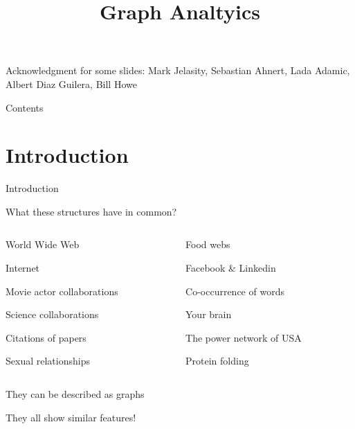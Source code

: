 
\title[Graph Analytics]{\textbf{Graph Analtyics}}



\newcommand{\Path}{\ell}
\newcommand{\Diam}{\mathit{diam}}

\begin{frame}
\titlepage

{\footnotesize
Acknowledgment for some slides: Mark Jelasity, Sebastian Ahnert, Lada Adamic, Albert Diaz Guilera, Bill Howe
}


\end{frame}

\begin{frame}[shrink]{Contents}
\tableofcontents
\end{frame}


\section{Introduction}

\begin{frame}{Introduction}

\begin{block}{What these structures have in common?}

\begin{columns}
\begin{column}{0.5\textwidth}
\BI
\item World Wide Web
\item Internet
\item Movie actor collaborations
\item Science collaborations
\item Citations of papers
\item Sexual relationships
\EI
\end{column}
\begin{column}{0.5\textwidth}
\BI
\item Food webs
\item Facebook \& Linkedin
\item Co-occurrence of words
\item Your brain
\item The power network of USA
\item Protein folding
\EI
\end{column}
\end{columns}
\end{block}

\pause
\bigskip
\BI
\item They can be described as graphs
\pause
\item They all show similar features!
\EI

\end{frame}


